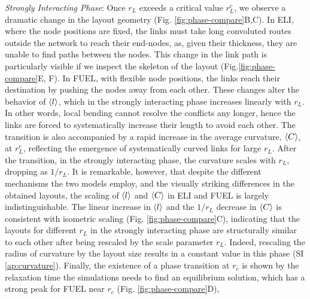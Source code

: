 \documentclass[nofootinbib,preprint,floatfix,titlepage,endfloats,superscriptaddress]{revtex4} %
\begin{document}
{\em Strongly Interacting Phase}: Once  $r_L$ exceeds a critical value $r_L^c$, we observe a dramatic change in the layout geometry (Fig. \ref{fig:phase-compare}B,C). 
In ELI, where the node positions are fixed, the links must take long convoluted routes outside the network to reach their end-nodes, as, given their thickness, they are unable to find paths between the nodes.  
This change in the link path is particularly visible if we inspect the skeleton of the layout (Fig.\ref{fig:phase-compare}E, F).
In FUEL, with flexible node positions, the links reach their destination by pushing the nodes away from each other. 
These changes alter the behavior of $\left<l\right>$, which in the strongly interacting phase increases linearly with $r_L$. 
In other words, local bending cannot resolve the conflicts any longer, hence the links are forced to systematically increase their length to avoid each other. 
The transition is also accompanied by a rapid increase in the average curvature, $\left<C\right>$,  at $r^c_L$, reflecting the emergence of systematically curved links for large $r_L$. 
After the transition, in the strongly interacting phase, the curvature scales  with $r_L$, dropping as $1/r_L$. 
It is remarkable, however, that despite the different mechanisms the two models employ, and the visually striking differences in the obtained layouts, the scaling of $\left<l\right>$ and $\left<C\right>$ in ELI and FUEL is largely indistinguishable. 
The linear increase in $\left<l\right>$ and the $1/r_L$ decrease in $\left<C\right>$ is consistent with isometric scaling (Fig. \ref{fig:phase-compare}C), indicating that the layouts for different $r_L$ in the strongly interacting phase are structurally similar to each other after being rescaled by the scale parameter $r_L$. %
Indeed, rescaling the radius of curvature by the layout size results in a constant value in this phase (SI \ref{ap:curvature}). 
Finally, the existence of a phase transition at $r_c$ is shown by
the relaxation time the simulations needs to find an equilibrium solution, which has a strong peak for FUEL near $r_c$ (Fig. \ref{fig:phase-compare}D), 
\end{document}
